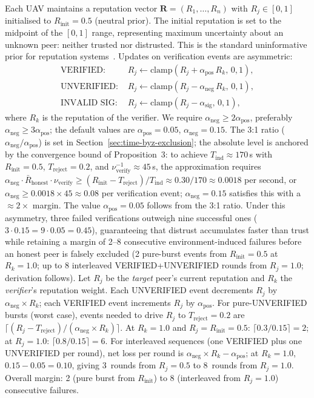 \documentclass[journal,10pt,twocolumn]{IEEEtran}
\begin{document}
Each UAV maintains a reputation vector $\mathbf{R} = (R_1,\dots,R_n)$ with $R_j \in [0,1]$ initialised to $R_\text{init} = 0.5$ (neutral prior). The initial reputation is set to the midpoint of the $[0,1]$ range, representing maximum uncertainty about an unknown peer: neither trusted nor distrusted. This is the standard uninformative prior for reputation systems~\cite{josang2007survey}. Updates on verification events are asymmetric:
\begin{align}
\text{VERIFIED: }& R_j \leftarrow \mathrm{clamp}(R_j + \alpha_\text{pos}\, R_k,\, 0, 1), \\
\text{UNVERIFIED: }& R_j \leftarrow \mathrm{clamp}(R_j - \alpha_\text{neg}\, R_k,\, 0, 1), \label{eq:asymm-decrement} \\
\text{INVALID SIG: }& R_j \leftarrow \mathrm{clamp}(R_j - \alpha_\text{sig},\, 0, 1),
\end{align}
where $R_k$ is the reputation of the verifier. We require $\alpha_\text{neg} \geq 2\alpha_\text{pos}$, preferably $\alpha_\text{neg} \geq 3\alpha_\text{pos}$; the default values are $\alpha_\text{pos} = 0.05$, $\alpha_\text{neg} = 0.15$. The 3:1 ratio ($\alpha_\text{neg}/\alpha_\text{pos}$) is set in Section~\ref{sec:time-byz-exclusion}; the absolute level is anchored by the convergence bound of Proposition~3: to achieve $T_\text{ind} \approx 170$\,s with $R_\text{init}=0.5$, $T_\text{reject}=0.2$, and $\nu_\text{verify}^{-1}\approx45$\,s, the approximation requires $\alpha_\text{neg} \cdot \bar{R}_\text{honest} \cdot \nu_\text{verify} \geq (R_\text{init}-T_\text{reject})/T_\text{ind} \approx 0.30/170 \approx 0.0018$ per second, or $\alpha_\text{neg} \geq 0.0018 \times 45 \approx 0.08$ per verification event; $\alpha_\text{neg}=0.15$ satisfies this with a $\approx 2\times$ margin. The value $\alpha_\text{pos}=0.05$ follows from the 3:1 ratio. Under this asymmetry, three failed verifications outweigh nine successful ones ($3\cdot 0.15 = 9\cdot 0.05 = 0.45$), guaranteeing that distrust accumulates faster than trust while retaining a margin of 2--8 consecutive environment-induced failures before an honest peer is falsely excluded (2 pure-burst events from $R_\text{init}=0.5$ at $R_k=1.0$; up to 8 interleaved VERIFIED+UNVERIFIED rounds from $R_j=1.0$; derivation follows). Let $R_j$ be the \emph{target} peer's current reputation and $R_k$ the \emph{verifier}'s reputation weight. Each UNVERIFIED event decrements $R_j$ by $\alpha_\text{neg} \times R_k$; each VERIFIED event increments $R_j$ by $\alpha_\text{pos}$. For pure-UNVERIFIED bursts (worst case), events needed to drive $R_j$ to $T_\text{reject}=0.2$ are $\lceil(R_j - T_\text{reject})/(\alpha_\text{neg}\times R_k)\rceil$. At $R_k=1.0$ and $R_j=R_\text{init}=0.5$: $\lceil 0.3/0.15\rceil=2$; at $R_j=1.0$: $\lceil 0.8/0.15\rceil=6$. For interleaved sequences (one VERIFIED plus one UNVERIFIED per round), net loss per round is $\alpha_\text{neg}\times R_k - \alpha_\text{pos}$; at $R_k=1.0$, $0.15-0.05=0.10$, giving 3~rounds from $R_j=0.5$ to 8~rounds from $R_j=1.0$. Overall margin: 2 (pure burst from $R_\text{init}$) to 8 (interleaved from $R_j=1.0$) consecutive failures.
\end{document}
